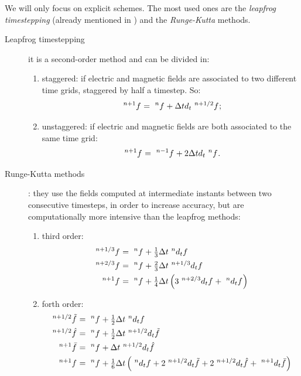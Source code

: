 We will only focus on explicit schemes. The most used ones are the
\emph{leapfrog timestepping} (already mentioned in
) and the \emph{Runge-Kutta}
methods.
\begin{description}
\item[Leapfrog timestepping] it is a second-order method and can be
  divided in:
  \begin{enumerate}
  \item
    staggered: if electric and magnetic fields are associated to two
    different time grids, staggered by half a timestep. So:
    \begin{equation} \label{eqn:lf1}
      \Disc{f}{}{n+1} = \Disc{f}{}{n} + \deltat d_t \Disc{f}{}{n+1/2} ;
    \end{equation}
  \item
    unstaggered: if electric and magnetic fields are both associated
    to the same time grid:
    \begin{equation} \label{eqn:lf2}
      \Disc{f}{}{n+1} = \Disc{f}{}{n-1} + 2\deltat d_t \Disc{f}{}{n} .
    \end{equation}
  \end{enumerate}
\item[Runge-Kutta methods]: they use the fields computed at intermediate
  instants between two consecutive timesteps, in order to increase
  accuracy, but are computationally more intensive than the leapfrog
  methods:
  \begin{enumerate}
  \item
    third order:
    \begin{equation} \label{eqn:rk3} \begin{split}
	\Disc{f}{}{n+1/3} & = \Disc{f}{}{n} + \tfrac{1}{3} \deltat
	\Disc{d_t f}{}{n} \\
	\Disc{f}{}{n+2/3} & = \Disc{f}{}{n} + \tfrac{2}{3} \deltat
	\Disc{d_t f}{}{n+1/3} \\
	\Disc{f}{}{n+1} & = \Disc{f}{}{n} + \tfrac{1}{4} \deltat
	\left( 3\Disc{d_t f}{}{n+2/3} + \Disc{d_t f}{}{n} \right)
    \end{split} \end{equation}
  \item
    forth order:
    \begin{equation} \label{eqn:rk4} \begin{split}
	\Disc{\tilde{f}}{}{n+1/2} & = \Disc{f}{}{n} + \tfrac{1}{2} \deltat
	\Disc{d_t f}{}{n} \\
	\Disc{\hat{f}}{}{n+1/2} & = \Disc{f}{}{n} + \tfrac{1}{2} \deltat
	\Disc{d_t \tilde{f}}{}{n+1/2} \\
	\Disc{\bar{f}}{}{n+1} & = \Disc{f}{}{n} + \deltat \Disc{d_t \hat{f}}{}{n+1/2} \\
	\Disc{f}{}{n+1} & = \Disc{f}{}{n} + \tfrac{1}{6} \deltat
	\left( \Disc{d_t f}{}{n} + 2\Disc{d_t \tilde{f}}{}{n+1/2} +
	2\Disc{d_t \hat{f}}{}{n+1/2} + \Disc{d_t \bar{f}}{}{n+1} \right)
    \end{split} \end{equation}
  \end{enumerate}
\end{description}

